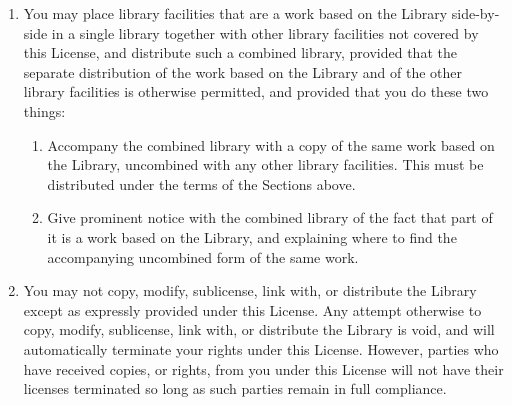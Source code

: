 {\begin{multicols}{2}
\begin{enumerate}
\begin{enumerate}
\end{enumerate}

For an executable, the required form of the ``work that uses the Library'' must 
include any data and utility programs needed for reproducing the executable from 
it. However, as a special exception, the materials to be distributed need not 
include anything that is normally distributed (in either source or binary form) 
with the major components (compiler, kernel, and so on) of the operating system 
on which the executable runs, unless that component itself accompanies the 
executable.

It may happen that this requirement contradicts the license restrictions of 
other proprietary libraries that do not normally accompany the operating system. 
Such a contradiction means you cannot use both them and the Library together in 
an executable that you distribute. 

\item
You may place library facilities that are a work based on the Library 
side-by-side in a single library together with other library facilities not 
covered by this License, and distribute such a combined library, provided that 
the separate distribution of the work based on the Library and of the other 
library facilities is otherwise permitted, and provided that you do these two 
things:

\begin{enumerate}

\item
Accompany the combined library with a copy of the same work based on the 
Library, uncombined with any other library facilities. This must be distributed 
under the terms of the Sections above.

\item
Give prominent notice with the combined library of the fact that part of it is a 
work based on the Library, and explaining where to find the accompanying 
uncombined form of the same work. 

\end{enumerate}

\item
You may not copy, modify, sublicense, link with, or distribute the Library 
except as expressly provided under this License. Any attempt otherwise to copy, 
modify, sublicense, link with, or distribute the Library is void, and will 
automatically terminate your rights under this License. However, parties who 
have received copies, or rights, from you under this License will not have their 
licenses terminated so long as such parties remain in full compliance.


\end{enumerate}
\end{multicols}}
